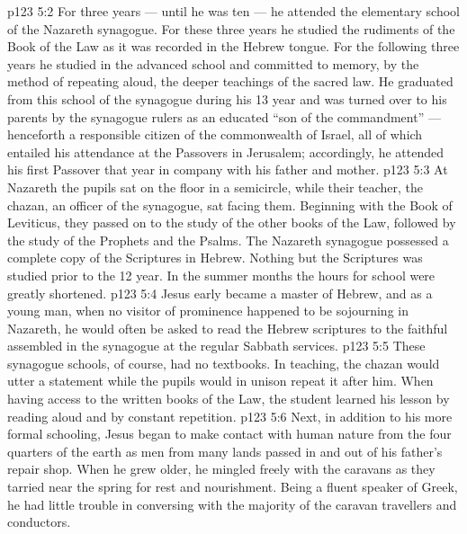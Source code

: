 \vs p123 5:2 For three years --- until he was ten --- he attended the elementary school of the Nazareth synagogue. For these three years he studied the rudiments of the Book of the Law as it was recorded in the Hebrew tongue. For the following three years he studied in the advanced school and committed to memory, by the method of repeating aloud, the deeper teachings of the sacred law. He graduated from this school of the synagogue during his 13 year and was turned over to his parents by the synagogue rulers as an educated “son of the commandment” --- henceforth a responsible citizen of the commonwealth of Israel, all of which entailed his attendance at the Passovers in Jerusalem; accordingly, he attended his first Passover that year in company with his father and mother.
\vs p123 5:3 \pc At Nazareth the pupils sat on the floor in a semicircle, while their teacher, the chazan, an officer of the synagogue, sat facing them. Beginning with the Book of Leviticus, they passed on to the study of the other books of the Law, followed by the study of the Prophets and the Psalms. The Nazareth synagogue possessed a complete copy of the Scriptures in Hebrew. Nothing but the Scriptures was studied prior to the 12 year. In the summer months the hours for school were greatly shortened.
\vs p123 5:4 Jesus early became a master of Hebrew, and as a young man, when no visitor of prominence happened to be sojourning in Nazareth, he would often be asked to read the Hebrew scriptures to the faithful assembled in the synagogue at the regular Sabbath services.
\vs p123 5:5 These synagogue schools, of course, had no textbooks. In teaching, the chazan would utter a statement while the pupils would in unison repeat it after him. When having access to the written books of the Law, the student learned his lesson by reading aloud and by constant repetition.
\vs p123 5:6 \pc Next, in addition to his more formal schooling, Jesus began to make contact with human nature from the four quarters of the earth as men from many lands passed in and out of his father’s repair shop. When he grew older, he mingled freely with the caravans as they tarried near the spring for rest and nourishment. Being a fluent speaker of Greek, he had little trouble in conversing with the majority of the caravan travellers and conductors.
